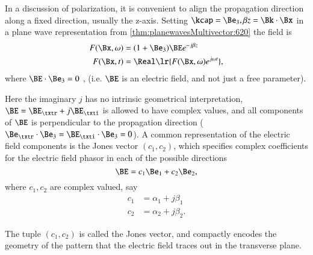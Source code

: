 %
%
In a discussion of polarization, it is convenient to align the propagation direction along a fixed direction, usually the z-axis.
Setting \( \kcap = \Be_3, \beta z = \Bk \cdot \Bx \)
in a
plane wave representation from
\cref{thm:planewavesMultivector:620}
the field is
\begin{dmath}\label{eqn:polarization:20}
\begin{aligned}
F(\Bx, \omega) &= (1 + \Be_3) \BE e^{-j \beta z} \\
F(\Bx, t) &= \Real\lr{ F(\Bx, \omega) e^{j \omega t} },
\end{aligned}
\end{dmath}
where \( \BE \cdot \Be_3 = 0 \)
, (i.e. \( \BE \) is an electric field, and not just a free parameter).

Here the imaginary \( j \) has no intrinsic geometrical interpretation, \( \BE = \BE_\txtr + j \BE_\txti \) is allowed to have complex values, and all components of \( \BE \) is perpendicular to the propagation direction (\( \Be_\txtr \cdot \Be_3 = \BE_\txti \cdot \Be_3 = 0 \)).
A common representation of the electric field components is the Jones vector \( (c_1, c_2) \), which specifies complex coefficients for the electric field phasor in each of the possible directions
\begin{dmath}\label{eqn:polarization:120}
\BE = c_1 \Be_1 + c_2 \Be_2,
\end{dmath}
where \( c_1, c_2 \) are complex valued, say
\begin{dmath}\label{eqn:polarization:140}
\begin{aligned}
c_1 &= \alpha_1 + j \beta_1 \\
c_2 &= \alpha_2 + j \beta_2.
\end{aligned}
\end{dmath}

The tuple \( (c_1, c_2) \) is called the Jones vector, and compactly encodes the geometry of the pattern that the electric field traces out in the transverse plane.

